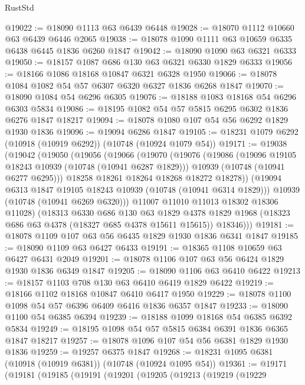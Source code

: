 \begin{lexlean}{RustStd}
\begin{coremodule}
@19022 := @18090 @1113 @63 @6439 @6448
@19028 := @18070 @1112 @10660 @63 @6439 @6446 @2065
@19038 := @18078 @1090 @1111 @63 @10659 @6335 @6438 @6445 @1836 @6260 @1847
@19042 := @18090 @1090 @63 @6321 @6333
@19050 := @18157 @1087 @686 @130 @63 @6321 @6330 @1829 @6333
@19056 := @18166 @1086 @18168 @10847 @6321 @6328 @1950
@19066 := @18078 @1084 @1082 @54 @57 @6307 @6320 @6327 @1836 @6268 @1847
@19070 := @18090 @1084 @54 @6296 @6305
@19076 := @18188 @1083 @18168 @54 @6296 @6303 @5834
@19086 := @18195 @1082 @54 @57 @5815 @6295 @6302 @1836 @6276 @1847 @18217
@19094 := @18078 @1080 @107 @54 @56 @6292 @1829 @1930 @1836
@19096 := @19094 @6286 @1847
@19105 := @18231 @1079 @6292 (@10918 (@10919 @6292)) (@10748 (@10924 @1079 @54))
@19171 := @19038
    (@19042
      (@19050
        (@19056
          (@19066
            (@19070
              (@19076
                (@19086
                  (@19096 @19105 @18243 @10939 (@10748 (@10941 @6287 @1829)))
                  @10939
                  (@10748 (@10941 @6277 @6295)))
                @18258
                @18261
                @18264
                @18268
                @18272
                @18278))
            (@19094 @6313 @1847 @19105 @18243 @10939 (@10748 (@10941 @6314 @1829)))
            @10939
            (@10748 (@10941 @6269 @6320)))
          @11007
          @11010
          @11013
          @18302
          @18306
          @11028)
        (@18313
          @6330
          @686
          @130
          @63
          @1829
          @4378
          @1829
          @1968
          (@18323 @686 @63 @4378 (@18327 @685 @4378 @15611 @15615))
          @18346)))
@19181 := @18078 @1109 @107 @63 @56 @6435 @1829 @1930 @1836 @6341 @1847
@19185 := @18090 @1109 @63 @6427 @6433
@19191 := @18365 @1108 @10659 @63 @6427 @6431 @2049
@19201 := @18078 @1106 @107 @63 @56 @6424 @1829 @1930 @1836 @6349 @1847
@19205 := @18090 @1106 @63 @6410 @6422
@19213 := @18157 @1103 @708 @130 @63 @6410 @6419 @1829 @6422
@19219 := @18166 @1102 @18168 @10847 @6410 @6417 @1950
@19229 := @18078 @1100 @1098 @54 @57 @6396 @6409 @6416 @1836 @6357 @1847
@19233 := @18090 @1100 @54 @6385 @6394
@19239 := @18188 @1099 @18168 @54 @6385 @6392 @5834
@19249 := @18195 @1098 @54 @57 @5815 @6384 @6391 @1836 @6365 @1847 @18217
@19257 := @18078 @1096 @107 @54 @56 @6381 @1829 @1930 @1836
@19259 := @19257 @6375 @1847
@19268 := @18231 @1095 @6381 (@10918 (@10919 @6381)) (@10748 (@10924 @1095 @54))
@19361 := @19171
    (@19181
      (@19185
        (@19191
          (@19201
            (@19205
              (@19213
                (@19219
                  (@19229

\end{coremodule}
\end{lexlean}
